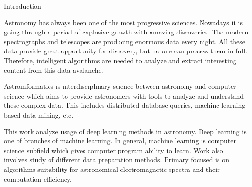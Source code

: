 \chap Introduction

Astronomy has always been one of the most progressive sciences. Nowadays it is
going through a period of explosive growth with amazing discoveries. The modern
spectrographs and telescopes are producing enormous data every night. All these
data provide great opportunity for discovery, but no one can process them
in full. Therefore, intelligent algorithms are needed to analyze and extract
interesting content from this data avalanche.

Astroinformatics is interdisciplinary science between astronomy and
computer science which aims to provide astronomers with tools to analyze and
understand these complex data. This includes distributed database queries,
machine learning based data mining, etc.

This work analyze usage of deep learning methods in astronomy.
Deep learning is one of branches of machine learning. In general, machine
learning is computer science subfield which gives computer program ability to
learn. Work also involves study of different data preparation methods.
Primary focused is on algorithms suitability for astronomical electromagnetic
spectra and their computation efficiency.
